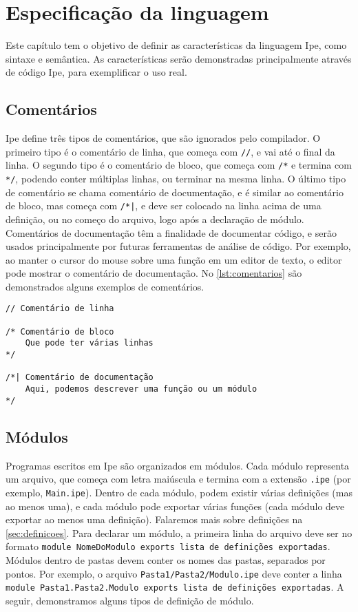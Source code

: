 
\chapter{Especificação da linguagem}

Este capítulo tem o objetivo de definir as características da linguagem Ipe, como
sintaxe e semântica. As características serão demonstradas principalmente através
de código Ipe, para exemplificar o uso real.

\section{Comentários}

Ipe define três tipos de comentários, que são ignorados pelo compilador. O primeiro
tipo é o comentário de linha, que começa com \texttt{//}, e vai até o final da linha.
O segundo tipo é o comentário de bloco, que começa com \texttt{/*} e termina com
\texttt{*/}, podendo conter múltiplas linhas, ou terminar na mesma linha. O último
tipo de comentário se chama comentário de documentação, e é similar ao comentário
de bloco, mas começa com \texttt{/*|}, e deve ser colocado na linha acima de uma
definição, ou no começo do arquivo, logo após a declaração de módulo. Comentários
de documentação têm a finalidade de documentar código, e serão usados principalmente por
futuras ferramentas de análise de código. Por exemplo, ao manter o cursor do
mouse sobre uma função em um editor de texto, o editor pode mostrar o comentário
de documentação. No \autoref{lst:comentarios} são demonstrados alguns exemplos
de comentários.

\begin{lstlisting}[label={lst:comentarios},caption={Exemplos de comentários}]
// Comentário de linha

/* Comentário de bloco
    Que pode ter várias linhas
*/

/*| Comentário de documentação
    Aqui, podemos descrever uma função ou um módulo 
*/
\end{lstlisting}

\section{Módulos}

Programas escritos em Ipe são organizados em módulos. Cada módulo representa um
arquivo, que começa com letra maiúscula e termina com a extensão \texttt{.ipe}
(por exemplo, \texttt{Main.ipe}). Dentro de cada módulo, podem existir várias
definições (mas ao menos uma), e cada módulo pode exportar várias funções (cada módulo
deve exportar ao menos uma definição). Falaremos mais sobre definições na
\autoref{sec:definicoes}. Para declarar um módulo, a primeira linha do arquivo deve
ser no formato \texttt{module NomeDoModulo exports {lista de definições exportadas}}.
Módulos dentro de pastas devem conter os nomes das pastas, separados por pontos.
Por exemplo, o arquivo \texttt{Pasta1/Pasta2/Modulo.ipe} deve conter a linha
\texttt{module Pasta1.Pasta2.Modulo exports {lista de definições exportadas}}.
A seguir, demonstramos alguns tipos de definição de módulo.

